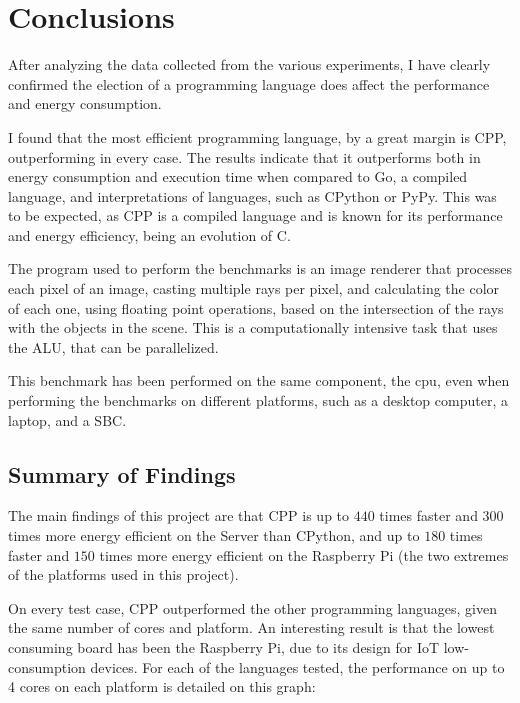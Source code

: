 \chapter{Conclusions}\label{chap:conclusions}

After analyzing the data collected from the various experiments, I have clearly confirmed the election of a programming language does affect the performance and energy consumption. 

I found that the most efficient programming language, by a great margin is \gls{CPP}, outperforming in every case. The results indicate that it outperforms both in energy consumption and execution time when compared to Go, a compiled language, and interpretations of languages, such as \gls{CPython} or PyPy. This was to be expected, as \gls{CPP} is a compiled language and is known for its performance and energy efficiency, being an evolution of C.

The program used to perform the benchmarks is an image renderer that processes each pixel of an image, casting multiple rays per pixel, and calculating the color of each one, using floating point operations, based on the intersection of the rays with the objects in the scene. This is a computationally intensive task that uses the \gls{ALU}, that can be parallelized.

This benchmark has been performed on the same component, the \gls{cpu}, even when performing the benchmarks on different platforms, such as a desktop computer, a laptop, and a \gls{SBC}.

\section{Summary of Findings}

The main findings of this project are that \gls{CPP} is up to $440$ times faster and $300$ times more energy efficient on the Server than \gls{CPython}, and up to $180$ times faster and $150$ times more energy efficient on the Raspberry Pi (the two extremes of the platforms used in this project). 

On every test case, \gls{CPP} outperformed the other programming languages, given the same number of cores and platform. An interesting result is that the lowest consuming board has been the Raspberry Pi, due to its design for IoT low-consumption devices. For each of the languages tested, the performance on up to 4 cores on each platform is detailed on this graph:




